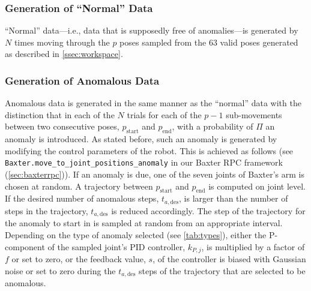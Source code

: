 \documentclass{scrartcl}
\newcommand{\baxterrpc}{Baxter RPC\xspace}
\begin{document}
        \subsubsection{Generation of ``Normal'' Data}
            ``Normal'' data---i.e., data that is supposedly free of anomalies---is generated by $N$ times moving through the $p$ poses sampled from the $63$ valid poses generated as described in \cref{ssec:workspace}.
    
        \subsubsection{Generation of Anomalous Data}
        \label{sssec:anomaly}
            Anomalous data is generated in the same manner as the ``normal'' data with the distinction that in each of the $N$ trials for each of the $p-1$ sub-movements between two consecutive poses, $p_{\mathrm{start}}$ and $p_{\mathrm{end}}$, with a probability of $\Pi$ an anomaly is introduced.
            As stated before, such an anomaly is generated by modifying the control parameters of the robot.
            This is achieved as follows (see \verb|Baxter.move_to_joint_positions_anomaly| in our \baxterrpc framework (\cref{sec:baxterrpc})).
            If an anomaly is due, one of the seven joints of Baxter's arm is chosen at random.
            A trajectory between $p_{\mathrm{start}}$ and $p_{\mathrm{end}}$ is computed on joint level.
            If the desired number of anomalous steps, $t_{a,\mathrm{des}}$, is larger than the number of steps in the trajectory, $t_{a,\mathrm{des}}$ is reduced accordingly.
            The step of the trajectory for the anomaly to start in is sampled at random from an appropriate interval.
            Depending on the type of anomaly selected (see \cref{tab:types}), either the P-component of the sampled joint's PID controller, $k_{P,j}$, is multiplied by a factor of $f$ or set to zero, or the feedback value, $s$, of the controller is biased with Gaussian noise or set to zero during the $t_{a,\mathrm{des}}$ steps of the trajectory that are selected to be anomalous.
\end{document}
